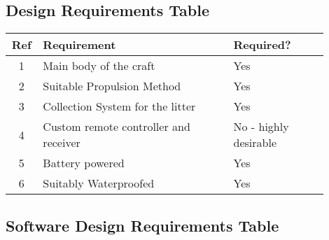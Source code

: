 \documentclass [11pt]{article}
\begin{document}
\begin{appendix}

\subsection{Design Requirements Table}\label{app:design_requirements_hardware}

\begin{table}[H]
\begin{tabular}{||c||p{0.6\linewidth}|p{0.3\linewidth}||}
\hline
Ref & Requirement                           & Required?             \\
\hline
1   & Main body of the craft                & Yes                   \\
\hline
2   & Suitable Propulsion Method            & Yes                   \\
\hline
3   & Collection System for the litter      & Yes                   \\
\hline
4   & Custom remote controller and receiver & No - highly desirable \\
\hline
5   & Battery powered                       & Yes                   \\
\hline
6   & Suitably Waterproofed                 & Yes\\
\hline              
\end{tabular}
\end{table}

\subsection{Software Design Requirements Table}\label{app:design_requirements_software}


\end{appendix}
\end{document}
